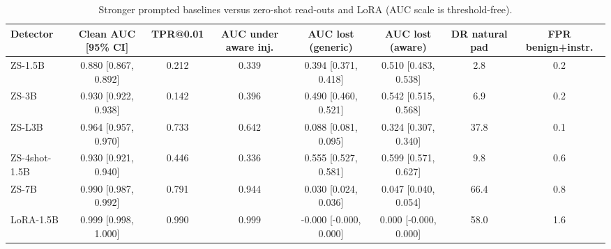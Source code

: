 \begin{table}[t]
\centering
\caption{Stronger prompted baselines versus zero-shot read-outs and LoRA (AUC scale is threshold-free).}
\label{tab:prompted}
\footnotesize
\begin{tabular}{lccccccc}
\toprule
\textbf{Detector} & \textbf{Clean AUC [95\% CI]} & \textbf{TPR@0.01} & \textbf{AUC under aware inj.} & \textbf{AUC lost (generic)} & \textbf{AUC lost (aware)} & \textbf{DR natural pad} & \textbf{FPR benign+instr.} \\
\midrule
ZS-1.5B & 0.880 [0.867, 0.892] & 0.212 & 0.339 & 0.394 [0.371, 0.418] & 0.510 [0.483, 0.538] & 2.8 & 0.2 \\
ZS-3B & 0.930 [0.922, 0.938] & 0.142 & 0.396 & 0.490 [0.460, 0.521] & 0.542 [0.515, 0.568] & 6.9 & 0.2 \\
ZS-L3B & 0.964 [0.957, 0.970] & 0.733 & 0.642 & 0.088 [0.081, 0.095] & 0.324 [0.307, 0.340] & 37.8 & 0.1 \\
ZS-4shot-1.5B & 0.930 [0.921, 0.940] & 0.446 & 0.336 & 0.555 [0.527, 0.581] & 0.599 [0.571, 0.627] & 9.8 & 0.6 \\
ZS-7B & 0.990 [0.987, 0.992] & 0.791 & 0.944 & 0.030 [0.024, 0.036] & 0.047 [0.040, 0.054] & 66.4 & 0.8 \\
LoRA-1.5B & 0.999 [0.998, 1.000] & 0.990 & 0.999 & -0.000 [-0.000, 0.000] & 0.000 [-0.000, 0.000] & 58.0 & 1.6 \\
\bottomrule
\end{tabular}
\end{table}